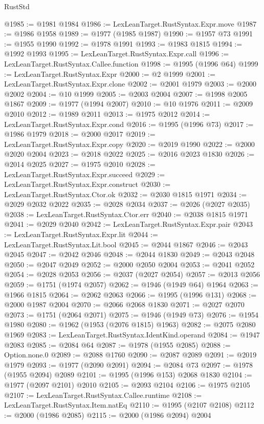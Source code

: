 \begin{lexlean}{RustStd}
\begin{coremodule}
{\begin{coremodule}
{{{{{{{{{{{{{{{{{{{{{{{{{{{{{{{@1985 := @1981 @1984
@1986 := LexLeanTarget.RustSyntax.Expr.move
@1987 := @1986 @1958
@1989 := @1977 (@1985 @1987)
@1990 := @1957 @73
@1991 := @1955 @1990
@1992 := @1978 @1991
@1993 := @1983 @1815
@1994 := @1992 @1993
@1995 := LexLeanTarget.RustSyntax.Expr.call
@1996 := LexLeanTarget.RustSyntax.Callee.function
@1998 := @1995 (@1996 @64)
@1999 := LexLeanTarget.RustSyntax.Expr
@2000 := @2 @1999
@2001 := LexLeanTarget.RustSyntax.Expr.clone
@2002 := @2001 @1979
@2003 := @2000 @2002
@2004 := @10 @1999
@2005 := @2003 @2004
@2007 := @1998 @2005 @1867
@2009 := @1977 (@1994 @2007)
@2010 := @10 @1976
@2011 := @2009 @2010
@2012 := @1989 @2011
@2013 := @1975 @2012
@2014 := LexLeanTarget.RustSyntax.Expr.cond
@2016 := @1995 (@1996 @73)
@2017 := @1986 @1979
@2018 := @2000 @2017
@2019 := LexLeanTarget.RustSyntax.Expr.copy
@2020 := @2019 @1990
@2022 := @2000 @2020 @2004
@2023 := @2018 @2022
@2025 := @2016 @2023 @1830
@2026 := @2014 @2025
@2027 := @1975 @2010
@2028 := LexLeanTarget.RustSyntax.Expr.succeed
@2029 := LexLeanTarget.RustSyntax.Expr.construct
@2030 := LexLeanTarget.RustSyntax.Ctor.ok
@2032 := @2030 @1815 @1971
@2034 := @2029 @2032 @2022
@2035 := @2028 @2034
@2037 := @2026 (@2027 @2035)
@2038 := LexLeanTarget.RustSyntax.Ctor.err
@2040 := @2038 @1815 @1971
@2041 := @2029 @2040
@2042 := LexLeanTarget.RustSyntax.Expr.pair
@2043 := LexLeanTarget.RustSyntax.Expr.lit
@2044 := LexLeanTarget.RustSyntax.Lit.bool
@2045 := @2044 @1867
@2046 := @2043 @2045
@2047 := @2042 @2046
@2048 := @2044 @1830
@2049 := @2043 @2048
@2050 := @2047 @2049
@2052 := @2000 @2050 @2004
@2053 := @2041 @2052
@2054 := @2028 @2053
@2056 := @2037 (@2027 @2054)
@2057 := @2013 @2056
@2059 := @1751 (@1974 @2057)
@2062 := @1946 (@1949 @64) @1964
@2063 := @1966 @1815
@2064 := @2062 @2063
@2066 := @1995 (@1996 @131)
@2068 := @2000 @1987 @2004
@2070 := @2066 @2068 @1830
@2071 := @2027 @2070
@2073 := @1751 (@2064 @2071)
@2075 := @1946 (@1949 @73)
@2076 := @1954 @1980
@2080 := @1962 (@1953 (@2076 @1815) @1963)
@2082 := @2075 @2080 @1969
@2083 := LexLeanTarget.RustSyntax.IdentKind.operand
@2084 := @1947 @2083
@2085 := @2084 @64
@2087 := @1978 (@1955 @2085)
@2088 := Option.none.{0}
@2089 := @2088 @1760
@2090 := @2087 @2089
@2091 := @2019 @1979
@2093 := @1977 (@2090 @2091)
@2094 := @2084 @73
@2097 := @1978 (@1955 @2094) @2089
@2101 := @1995 (@1996 @153) @2068 @1830
@2104 := @1977 (@2097 @2101) @2010
@2105 := @2093 @2104
@2106 := @1975 @2105
@2107 := LexLeanTarget.RustSyntax.Callee.runtime
@2108 := LexLeanTarget.RustSyntax.Item.natEq
@2110 := @1995 (@2107 @2108)
@2112 := @2000 (@1986 @2085)
@2115 := @2000 (@1986 @2094) @2004
}}}}}}}}}}}}}}}}}}}}}}}}}}}}}}}
\end{coremodule}}
\end{coremodule}
\end{lexlean}
